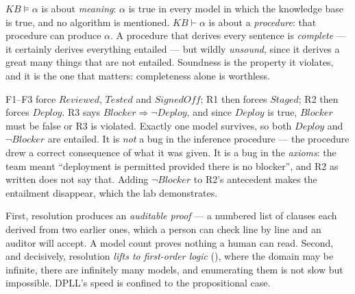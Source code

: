 \begin{ans}
  \item $\mathit{KB} \models \alpha$ is about \emph{meaning}: $\alpha$ is true in
        every model in which the knowledge base is true, and no algorithm is
        mentioned. $\mathit{KB} \vdash \alpha$ is about a \emph{procedure}: that
        procedure can produce $\alpha$. A procedure that derives every sentence is
        \emph{complete} --- it certainly derives everything entailed --- but wildly
        \emph{unsound}, since it derives a great many things that are not entailed.
        Soundness is the property it violates, and it is the one that matters:
        completeness alone is worthless.
  \item F1--F3 force $\mathit{Reviewed}$, $\mathit{Tested}$ and
        $\mathit{SignedOff}$; R1 then forces $\mathit{Staged}$; R2 then forces
        $\mathit{Deploy}$. R3 says $\mathit{Blocker} \Rightarrow \neg
        \mathit{Deploy}$, and since $\mathit{Deploy}$ is true, $\mathit{Blocker}$
        must be false or R3 is violated. Exactly one model survives, so both
        $\mathit{Deploy}$ and $\neg\mathit{Blocker}$ are entailed.
        It is \emph{not} a bug in the inference procedure --- the procedure drew a
        correct consequence of what it was given. It is a bug in the \emph{axioms}:
        the team meant ``deployment is permitted provided there is no blocker'',
        and R2 as written does not say that. Adding $\neg\mathit{Blocker}$ to R2's
        antecedent makes the entailment disappear, which the lab demonstrates.
  \item First, resolution produces an \emph{auditable proof} --- a numbered list of
        clauses each derived from two earlier ones, which a person can check line by
        line and an auditor will accept. A model count proves nothing a human can
        read. Second, and decisively, resolution \emph{lifts to first-order logic}
        (), where the domain may be infinite, there are infinitely many
        models, and enumerating them is not slow but impossible. DPLL's speed is
        confined to the propositional case.
\end{ans}


